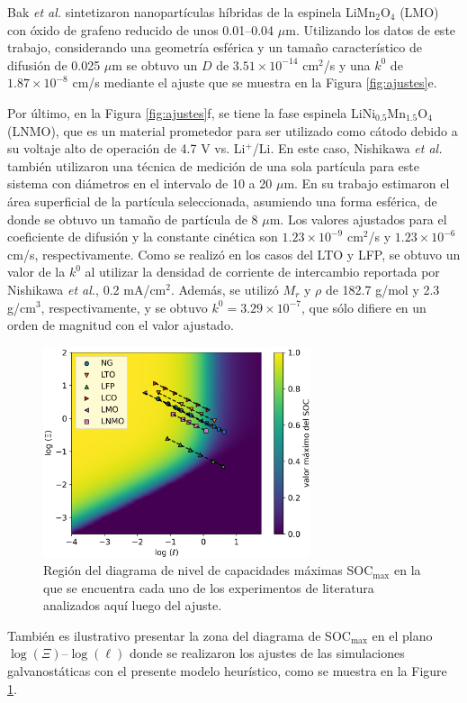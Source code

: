 Bak \textit{et al.} \cite{bak2011} sintetizaron nanopartículas híbridas de la 
espinela LiMn$_2$O$_4$ (LMO) con óxido de grafeno reducido de unos 0.01--0.04 
$\mu$m. Utilizando los datos de este trabajo, considerando una geometría esférica y un tamaño característico de 
difusión de 0.025 $\mu$m se obtuvo un $D$ de $3.51\times10^{-14}$ cm$^2$/s y una
$k^0$ de $1.87\times10^{-8}$ cm/s mediante el ajuste que se muestra en la Figura 
\ref{fig:ajustes}e.

Por último, en la Figura \ref{fig:ajustes}f, se tiene la fase espinela 
LiNi$_{0.5}$Mn$_{1.5}$O$_4$ (LNMO), que es un material prometedor para ser 
utilizado como cátodo debido a su voltaje alto de operación de 4.7 V vs. Li$^+$/Li. 
En este caso, Nishikawa \textit{et al.} \cite{nishikawa2017} también
utilizaron una técnica de medición de una sola partícula para este sistema con 
diámetros en el intervalo de 10 a 20 $\mu$m. En su trabajo estimaron el área 
superficial de la partícula seleccionada, asumiendo una forma esférica, de donde
se obtuvo un tamaño de partícula de 8 $\mu$m. Los valores ajustados para el
coeficiente de difusión y la constante cinética son $1.23\times10^{-9}$ cm$^2$/s 
y $1.23\times10^{-6}$ cm/s, respectivamente. Como se realizó en los casos del 
LTO y LFP, se obtuvo un valor de la $k^0$ al utilizar la densidad de corriente
de intercambio reportada por Nishikawa \textit{et al.}, 0.2 mA/cm$^2$. Además,
se utilizó $M_r$ y $\rho$ de 182.7 g/mol y 2.3 g/cm$^3$, respectivamente, y se
obtuvo $k^0 = 3.29\times10^{-7}$, que sólo difiere en un orden de magnitud con 
el valor ajustado.

\begin{figure}[t]
    \centering
    \includegraphics[width=0.7\textwidth]{FastCharging/un/resultados/ajuste/mapa.png}
    \caption{Región del diagrama de nivel de capacidades máximas SOC$_{\max}$ en la que se encuentra cada uno de los experimentos de literatura analizados aquí
    \cite{mancini2022, he2012, lei2015, wang2019high, bak2011, nishikawa2017}
    luego del ajuste.}
    \label{fig:ajustes-mapa}
\end{figure}
También es ilustrativo presentar la zona del diagrama de SOC$_{\max}$ en el plano $\log(\Xi)$--$\log(\ell)$ donde se realizaron los ajustes de las simulaciones galvanostáticas con el presente modelo 
heurístico, 
como se muestra en la Figure \ref{fig:ajustes-mapa}.

